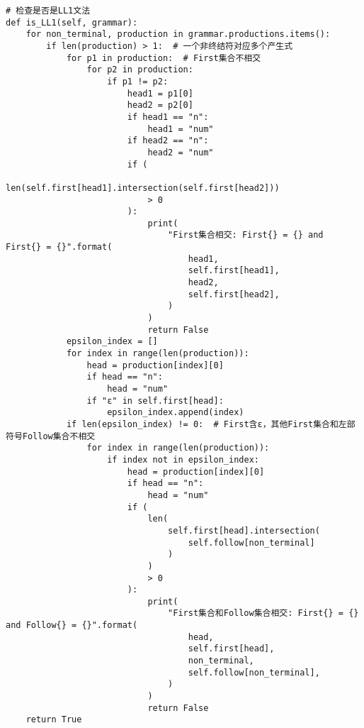 \documentclass[lang=cn,11pt,a4paper]{elegantpaper}
\begin{document}
\begin{lstlisting}
# 检查是否是LL1文法
def is_LL1(self, grammar):
    for non_terminal, production in grammar.productions.items():
        if len(production) > 1:  # 一个非终结符对应多个产生式
            for p1 in production:  # First集合不相交
                for p2 in production:
                    if p1 != p2:
                        head1 = p1[0]
                        head2 = p2[0]
                        if head1 == "n":
                            head1 = "num"
                        if head2 == "n":
                            head2 = "num"
                        if (
                            len(self.first[head1].intersection(self.first[head2]))
                            > 0
                        ):
                            print(
                                "First集合相交: First{} = {} and First{} = {}".format(
                                    head1,
                                    self.first[head1],
                                    head2,
                                    self.first[head2],
                                )
                            )
                            return False
            epsilon_index = []
            for index in range(len(production)):
                head = production[index][0]
                if head == "n":
                    head = "num"
                if "ε" in self.first[head]:
                    epsilon_index.append(index)
            if len(epsilon_index) != 0:  # First含ε，其他First集合和左部符号Follow集合不相交
                for index in range(len(production)):
                    if index not in epsilon_index:
                        head = production[index][0]
                        if head == "n":
                            head = "num"
                        if (
                            len(
                                self.first[head].intersection(
                                    self.follow[non_terminal]
                                )
                            )
                            > 0
                        ):
                            print(
                                "First集合和Follow集合相交: First{} = {} and Follow{} = {}".format(
                                    head,
                                    self.first[head],
                                    non_terminal,
                                    self.follow[non_terminal],
                                )
                            )
                            return False
    return True
\end{lstlisting}
\end{document}
